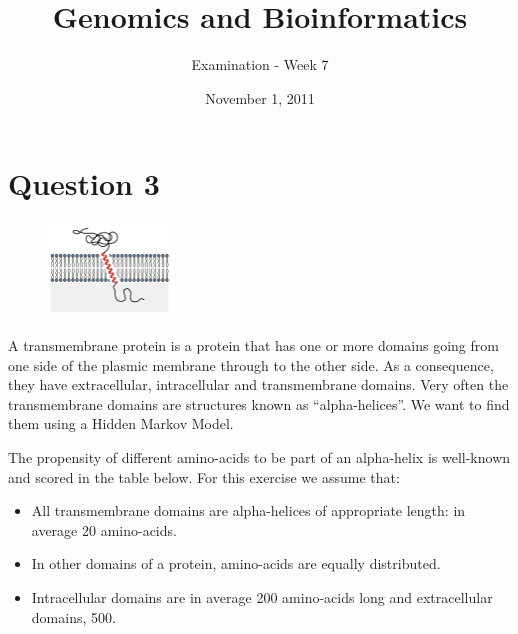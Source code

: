 \documentclass[a4paper,11pt]{article}
\title{Genomics and Bioinformatics}
\date{November 1, 2011}
\author{Examination - Week 7}
\begin{document}
\section*{Question 3}


\setlength\intextsep{0pt}
\begin{figure}
\includegraphics[width=0.3\textwidth]{figures/transmembrane.pdf}
\end{figure}

A transmembrane protein is a protein that has one or more domains going from one side of the 
plasmic membrane through to the other side. As a consequence, they have extracellular, 
intracellular and transmembrane domains. 
Very often the transmembrane domains are structures 
known as ``alpha-helices''. We want to find them using a Hidden Markov Model.

The propensity of different amino-acids to be part of an alpha-helix is well-known and scored in the table below.
For this exercise we assume that:
\begin{itemize}%
\item All transmembrane domains are alpha-helices of appropriate length: in average 20 amino-acids.
\item In other domains of a protein, amino-acids are equally distributed.
\item Intracellular domains are in average 200 amino-acids long and extracellular domains, 500.
\end{itemize}

\end{document}
